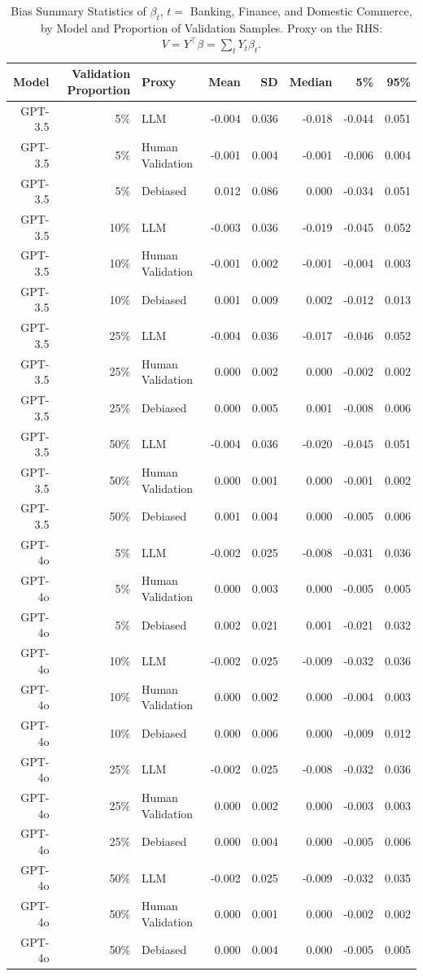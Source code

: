 \begin{table}

\caption{\label{tab:unnamed-chunk-1}Bias Summary Statistics of $\beta_{t}$, $t=$ Banking, Finance, and Domestic Commerce, by Model and Proportion of Validation Samples.
      Proxy on the RHS: $V = Y^\top \beta = \sum_{t} Y_t \beta_t$.}
\centering
\begin{tabular}[t]{rrlrrrrr}
\toprule
Model & Validation Proportion & Proxy & Mean & SD & Median & 5\% & 95\%\\
\midrule
GPT-3.5 & 5\% & LLM & -0.004 & 0.036 & -0.018 & -0.044 & 0.051\\
GPT-3.5 & 5\% & Human Validation & -0.001 & 0.004 & -0.001 & -0.006 & 0.004\\
GPT-3.5 & 5\% & Debiased & 0.012 & 0.086 & 0.000 & -0.034 & 0.051\\
GPT-3.5 & 10\% & LLM & -0.003 & 0.036 & -0.019 & -0.045 & 0.052\\
GPT-3.5 & 10\% & Human Validation & -0.001 & 0.002 & -0.001 & -0.004 & 0.003\\
GPT-3.5 & 10\% & Debiased & 0.001 & 0.009 & 0.002 & -0.012 & 0.013\\
GPT-3.5 & 25\% & LLM & -0.004 & 0.036 & -0.017 & -0.046 & 0.052\\
GPT-3.5 & 25\% & Human Validation & 0.000 & 0.002 & 0.000 & -0.002 & 0.002\\
GPT-3.5 & 25\% & Debiased & 0.000 & 0.005 & 0.001 & -0.008 & 0.006\\
GPT-3.5 & 50\% & LLM & -0.004 & 0.036 & -0.020 & -0.045 & 0.051\\
GPT-3.5 & 50\% & Human Validation & 0.000 & 0.001 & 0.000 & -0.001 & 0.002\\
GPT-3.5 & 50\% & Debiased & 0.001 & 0.004 & 0.000 & -0.005 & 0.006\\
GPT-4o & 5\% & LLM & -0.002 & 0.025 & -0.008 & -0.031 & 0.036\\
GPT-4o & 5\% & Human Validation & 0.000 & 0.003 & 0.000 & -0.005 & 0.005\\
GPT-4o & 5\% & Debiased & 0.002 & 0.021 & 0.001 & -0.021 & 0.032\\
GPT-4o & 10\% & LLM & -0.002 & 0.025 & -0.009 & -0.032 & 0.036\\
GPT-4o & 10\% & Human Validation & 0.000 & 0.002 & 0.000 & -0.004 & 0.003\\
GPT-4o & 10\% & Debiased & 0.000 & 0.006 & 0.000 & -0.009 & 0.012\\
GPT-4o & 25\% & LLM & -0.002 & 0.025 & -0.008 & -0.032 & 0.036\\
GPT-4o & 25\% & Human Validation & 0.000 & 0.002 & 0.000 & -0.003 & 0.003\\
GPT-4o & 25\% & Debiased & 0.000 & 0.004 & 0.000 & -0.005 & 0.006\\
GPT-4o & 50\% & LLM & -0.002 & 0.025 & -0.009 & -0.032 & 0.035\\
GPT-4o & 50\% & Human Validation & 0.000 & 0.001 & 0.000 & -0.002 & 0.002\\
GPT-4o & 50\% & Debiased & 0.000 & 0.004 & 0.000 & -0.005 & 0.005\\
\bottomrule
\end{tabular}
\end{table}
